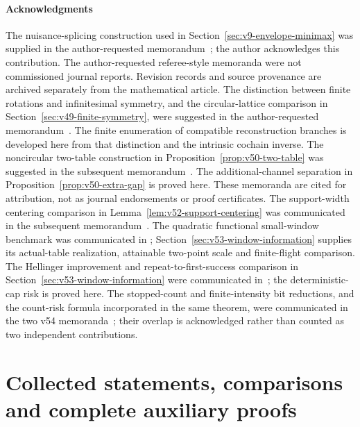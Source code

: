 \subsection*{Acknowledgments}
The nuisance-splicing construction used in
Section~\ref{sec:v9-envelope-minimax} was supplied in the
author-requested memorandum~\cite{A2ReviewV8}; the author acknowledges
this contribution.  The author-requested referee-style memoranda were
not commissioned journal reports.  Revision records and source
provenance are archived separately from the mathematical article.
The distinction between finite rotations and infinitesimal symmetry, and
the circular-lattice comparison in Section~\ref{sec:v49-finite-symmetry},
were suggested in the author-requested memorandum~\cite{A2ReviewV48}.
The finite enumeration of compatible reconstruction branches is developed
here from that distinction and the intrinsic cochain inverse.
The noncircular two-table construction in
Proposition~\ref{prop:v50-two-table} was suggested in the subsequent
memorandum~\cite{A2ReviewV49}.  The additional-channel separation in
Proposition~\ref{prop:v50-extra-gap} is proved here.  These memoranda
are cited for attribution, not as journal endorsements or proof
certificates.
The support-width centering comparison in
Lemma~\ref{lem:v52-support-centering} was communicated in the
subsequent memorandum~\cite{A2ReviewV51}.
The quadratic functional small-window benchmark was communicated in
\cite{A2ReviewV52}; Section~\ref{sec:v53-window-information} supplies
its actual-table realization, attainable two-point scale and finite-flight
comparison.  The Hellinger improvement and repeat-to-first-success
comparison in Section~\ref{sec:v53-window-information} were communicated
in~\cite{A2ReviewV53}; the deterministic-cap risk is proved here.
The stopped-count and finite-intensity bit reductions, and the count-risk
formula incorporated in the same theorem, were communicated in the two
v54 memoranda~\cite{A2ReviewV54First,A2ReviewV54Second}; their overlap
is acknowledged rather than counted as two independent contributions.

\appendix
\renewcommand{\thesection}{A.\arabic{section}}
\renewcommand{\theHsection}{appendix.\arabic{section}}
\part{Collected statements, comparisons and complete auxiliary proofs}










